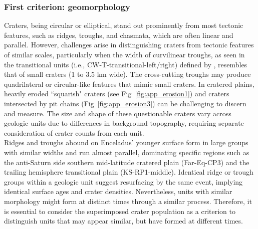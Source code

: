 \documentclass[preprint,12pt,3p,times,authoryear]{elsarticle}
\begin{document}
\subsubsection{First criterion: geomorphology}
Craters, being circular or elliptical, stand out prominently from most tectonic features, such as ridges, troughs, and chasmata, which are often linear and parallel. However, challenges arise in distinguishing craters from tectonic features of similar scales, particularly when the width of curvilinear troughs, as seen in the transitional units (i.e., CW-T-transitional-left/right) defined by \citet{CrowWillard2015}, resembles that of small craters (1 to 3.5 km wide). The cross-cutting troughs may produce quadrilateral or circular-like features that mimic small craters. 
In cratered plains, heavily eroded ``squarish" craters (see Fig~\ref{fig:app_erosion1}) and craters intersected by pit chains (Fig~\ref{fig:app_erosion3}) can be challenging to discern and measure. The size and shape of these questionable craters vary across geologic units due to differences in background topography, requiring separate consideration of crater counts from each unit.\\

Ridges and troughs abound on Enceladus’ younger surface form in large groups with similar widths and run almost parallel, dominating specific regions such as the anti-Saturn side southern mid-latitude cratered plain (Far-Eq-CP3) and the trailing hemisphere transitional plain (KS-RP1-middle). Identical ridge or trough groups within a geologic unit suggest resurfacing by the same event, implying identical surface ages and crater densities. Nevertheless, units with similar morphology might form at distinct times through a similar process. Therefore, it is essential to consider the superimposed crater population as a criterion to distinguish units that may appear similar, but have formed at different times.
\end{document}
